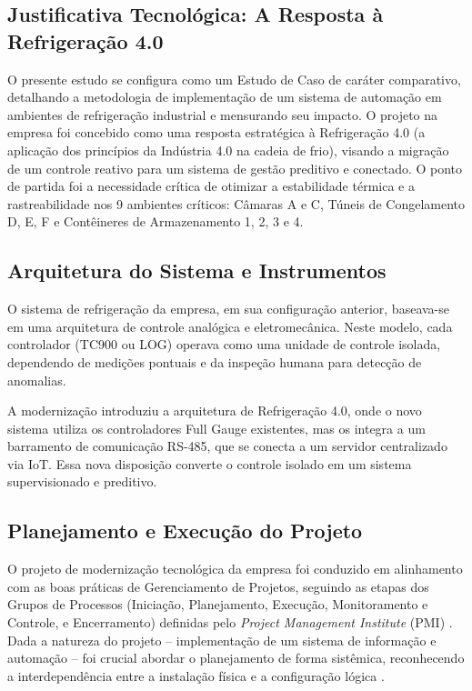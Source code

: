 \documentclass[12pt]{article}
\begin{document}
\subsection{Justificativa Tecnológica: A Resposta à Refrigeração 4.0}

O presente estudo se configura como um Estudo de Caso de caráter comparativo, detalhando a metodologia de implementação de um sistema de automação em ambientes de refrigeração industrial e mensurando seu impacto. O projeto na empresa foi concebido como uma resposta estratégica à Refrigeração 4.0 (a aplicação dos princípios da Indústria 4.0 na cadeia de frio), visando a migração de um controle reativo para um sistema de gestão preditivo e conectado. O ponto de partida foi a necessidade crítica de otimizar a estabilidade térmica e a rastreabilidade nos 9 ambientes críticos: Câmaras A e C, Túneis de Congelamento D, E, F e Contêineres de Armazenamento 1, 2, 3 e 4.

\subsection{Arquitetura do Sistema e Instrumentos}

O sistema de refrigeração da empresa, em sua configuração anterior, baseava-se em uma arquitetura de controle analógica e eletromecânica. Neste modelo, cada controlador (TC900 ou LOG) operava como uma unidade de controle isolada, dependendo de medições pontuais e da inspeção humana para detecção de anomalias.

A modernização introduziu a arquitetura de Refrigeração 4.0, onde o novo sistema utiliza os controladores Full Gauge existentes, mas os integra a um barramento de comunicação RS-485, que se conecta a um servidor centralizado via IoT. Essa nova disposição converte o controle isolado em um sistema supervisionado e preditivo.

\subsection{Planejamento e Execução do Projeto}

O projeto de modernização tecnológica da empresa foi conduzido em alinhamento com as boas práticas de Gerenciamento de Projetos, seguindo as etapas dos Grupos de Processos (Iniciação, Planejamento, Execução, Monitoramento e Controle, e Encerramento) definidas pelo \textit{Project Management Institute} (PMI) \cite{pmbok2021}. Dada a natureza do projeto – implementação de um sistema de informação e automação – foi crucial abordar o planejamento de forma sistêmica, reconhecendo a interdependência entre a instalação física e a configuração lógica \cite{kerzner2015}.
\end{document}
